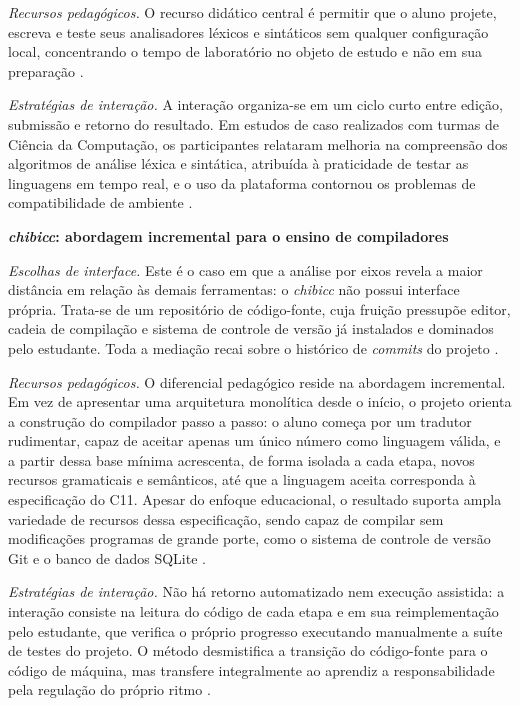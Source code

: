 \textit{Recursos pedagógicos.} O recurso didático central é permitir que o aluno projete, escreva e teste seus analisadores léxicos e sintáticos sem qualquer configuração local, concentrando o tempo de laboratório no objeto de estudo e não em sua preparação \cite{ladgelson2021}.

\textit{Estratégias de interação.} A interação organiza-se em um ciclo curto entre edição, submissão e retorno do resultado. Em estudos de caso realizados com turmas de Ciência da Computação, os participantes relataram melhoria na compreensão dos algoritmos de análise léxica e sintática, atribuída à praticidade de testar as linguagens em tempo real, e o uso da plataforma contornou os problemas de compatibilidade de ambiente \cite{ladgelson2021}.

\noindent\textbf{\textit{chibicc}: abordagem incremental para o ensino de compiladores}

\textit{Escolhas de interface.} Este é o caso em que a análise por eixos revela a maior distância em relação às demais ferramentas: o \textit{chibicc} não possui interface própria. Trata-se de um repositório de código-fonte, cuja fruição pressupõe editor, cadeia de compilação e sistema de controle de versão já instalados e dominados pelo estudante. Toda a mediação recai sobre o histórico de \textit{commits} do projeto \cite{ueyama2020}.

\textit{Recursos pedagógicos.} O diferencial pedagógico reside na abordagem incremental. Em vez de apresentar uma arquitetura monolítica desde o início, o projeto orienta a construção do compilador passo a passo: o aluno começa por um tradutor rudimentar, capaz de aceitar apenas um único número como linguagem válida, e a partir dessa base mínima acrescenta, de forma isolada a cada etapa, novos recursos gramaticais e semânticos, até que a linguagem aceita corresponda à especificação do C11. Apesar do enfoque educacional, o resultado suporta ampla variedade de recursos dessa especificação, sendo capaz de compilar sem modificações programas de grande porte, como o sistema de controle de versão Git e o banco de dados SQLite \cite{ueyama2020}.

\textit{Estratégias de interação.} Não há retorno automatizado nem execução assistida: a interação consiste na leitura do código de cada etapa e em sua reimplementação pelo estudante, que verifica o próprio progresso executando manualmente a suíte de testes do projeto. O método desmistifica a transição do código-fonte para o código de máquina, mas transfere integralmente ao aprendiz a responsabilidade pela regulação do próprio ritmo \cite{ueyama2020}.

